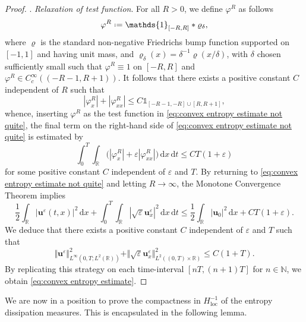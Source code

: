 \documentclass[11pt,a4paper,reqno]{amsart}
\numberwithin{equation}{section}
\theoremstyle{definition}
\theoremstyle{remark}
\newcommand{\bu}{\mathbf{u}}
\renewcommand{\d}{\, \mathrm{d}}
\newcommand{\loc}{\mathrm{loc}}
\renewcommand{\leq}{\leqslant}
\newcommand*{\defeq}{\mathrel{\vcenter{\baselineskip0.5ex \lineskiplimit0pt
                     \hbox{\scriptsize.}\hbox{\scriptsize.}}}%
                     =}
\begin{document}
{\begin{proof}
\smallskip 
{}. \textit{Relaxation of test function}. For all $R>0$, we define $\varphi^R$ as follows 
\begin{equation*}
    \varphi^R  \defeq  \mathds{1}_{[-R,R]}*\varrho_{\delta}, 
\end{equation*}
where $\varrho$ is the standard non-negative Friedrichs bump function supported on $[-1,1]$ and having unit mass, and $\varrho_{\delta}(x) = \delta^{-1} \varrho(x/\delta)$, with $\delta$ chosen sufficiently small such that $\varphi^R \equiv 1$ on $[-R,R]$ and $\varphi^R \in C^\infty_c((-R-1,R+1))$. It follows that there exists a positive constant $C$ independent of $R$ such that $$|\varphi^R_x|+|\varphi^R_{xx}| \leq C\mathds{1}_{[-R-1,-R]\cup[R,R+1]},$$
whence, inserting $\varphi^R$ as the test function in \eqref{eq:convex entropy estimate not quite}, the final term on the right-hand side of \eqref{eq:convex entropy estimate not quite} is estimated by 
\begin{equation*}
    \int_0^T \int_\mathbb{R}  \big( |\varphi^R_x| + \varepsilon |\varphi^R_{xx}| \big) \d x \d t \leq CT(1+\varepsilon) 
\end{equation*}
for some positive constant $C$ independent of $\varepsilon$ and $T$. By returning to \eqref{eq:convex entropy estimate not quite} and letting $R\to \infty$, the Monotone Convergence Theorem implies 
\begin{equation*}
    \frac{1}{2}\int_\mathbb{R} |\bu^\varepsilon(t,x)|^2 \d x + \int_0^T \int_\mathbb{R} |\sqrt{\varepsilon}\bu^\varepsilon_x|^2 \d x \d t \leq \frac{1}{2}\int_\mathbb{R} |\bu_0|^2 \d x + CT(1+\varepsilon). 
\end{equation*}
We deduce that there exists a positive constant $C$ independent of $\varepsilon$ and $T$ such that 
\begin{equation*}
    \Vert \bu^\varepsilon\Vert^2_{L^\infty(0,T;L^2(\mathbb{R}))} + \Vert \sqrt{\varepsilon}\bu^\varepsilon_x \Vert^2_{L^2((0,T)\times\mathbb{R})} \leq C(1+T). 
\end{equation*}
By replicating this strategy on each time-interval $[nT,(n+1)T]$ for $n \in \mathbb{N}$, we obtain \eqref{eq:convex entropy estimate}. 
\end{proof}



We are now in a position to prove the compactness in $H^{-1}_\loc$ of the entropy dissipation measures. This is encapsulated in the following lemma. 

}
\end{document}

